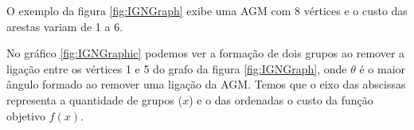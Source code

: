 \begin{figure}[!ht]
	\centering
\end{figure}
\FloatBarrier

O exemplo da figura \ref{fig:IGNGraph} exibe uma \acrshort{AGM} com 8 vértices e o custo das arestas variam de 1 a 6.

\begin{figure}[!ht]
	\centering
\end{figure}

No gráfico \ref{fig:IGNGraphic} podemos ver a formação de dois grupos ao remover a ligação entre os vértices 1 e 5 do grafo da figura \ref{fig:IGNGraph}, onde ${\theta}$ é o maior ângulo formado ao remover uma ligação da \acrshort{AGM}. Temos que o eixo das abscissas representa a quantidade de grupos ($x$) e o das ordenadas o custo da função objetivo $f(x)$.

